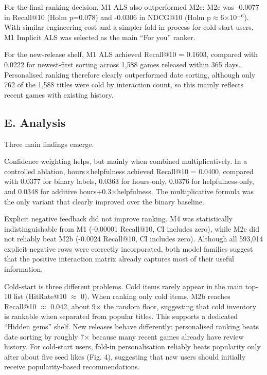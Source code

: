 \documentclass[conference]{IEEEtran}
\begin{document}
For the final ranking decision, M1 ALS also outperformed M2c: M2c was -0.0077 in Recall@10 (Holm p=0.078) and -0.0306 in NDCG@10 (Holm p\ensuremath{\approx}6\ensuremath{\times}10$^{-}$$^{6}$). With similar engineering cost and a simpler fold-in process for cold-start users, M1 Implicit ALS was selected as the main ``For you'' ranker.

For the new-release shelf, M1 ALS achieved Recall@10 = 0.1603, compared with 0.0222 for newest-first sorting across 1,588 games released within 365 days. Personalised ranking therefore clearly outperformed date sorting, although only 762 of the 1,588 titles were cold by interaction count, so this mainly reflects recent games with existing history.

\subsection*{E. Analysis}

Three main findings emerge.

Confidence weighting helps, but mainly when combined multiplicatively. In a controlled ablation, hours\ensuremath{\times}helpfulness achieved Recall@10 = 0.0400, compared with 0.0377 for binary labels, 0.0363 for hours-only, 0.0376 for helpfulness-only, and 0.0348 for additive hours+0.3\ensuremath{\times}helpfulness. The multiplicative formula was the only variant that clearly improved over the binary baseline.

Explicit negative feedback did not improve ranking. M4 was statistically indistinguishable from M1 (-0.00001 Recall@10, CI includes zero), while M2c did not reliably beat M2b (-0.0024 Recall@10, CI includes zero). Although all 593,014 explicit-negative rows were correctly incorporated, both model families suggest that the positive interaction matrix already captures most of their useful information.

Cold-start is three different problems. Cold items rarely appear in the main top-10 list (HitRate@10 \ensuremath{\approx} 0). When ranking only cold items, M2b reaches Recall@10 \ensuremath{\approx} 0.042, about 9\ensuremath{\times} the random floor, suggesting that cold inventory is rankable when separated from popular titles. This supports a dedicated ``Hidden gems'' shelf. New releases behave differently: personalised ranking beats date sorting by roughly 7\ensuremath{\times} because many recent games already have review history. For cold-start users, fold-in personalisation reliably beats popularity only after about five seed likes (Fig. 4), suggesting that new users should initially receive popularity-based recommendations.
\end{document}
